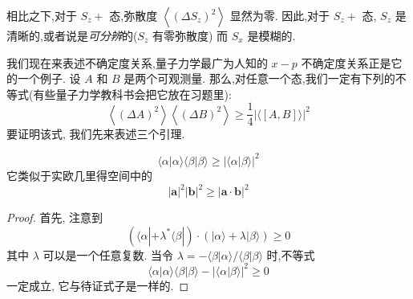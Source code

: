 \documentclass[lang=cn,newtx,10pt,scheme=chinese,thmcnt=section]{elegantbook}
\begin{document}
相比之下,对于 ${S}_{z} +$ 态,弥散度 $\left\langle {\left( \Delta {S}_{z}\right) }^{2}\right\rangle$ 显然为零. 因此,对于 ${S}_{z} +$ 态, ${S}_{z}$ 是清晰的,或者说是\textit{可分辨}的(${S}_{z}$ 有零弥散度) 而 ${S}_{x}$ 是模糊的.

我们现在来表述不确定度关系,量子力学最广为人知的 $x - p$ 不确定度关系正是它的一个例子. 设 $A$ 和 $B$ 是两个可观测量. 那么,对任意一个态,我们一定有下列的不等式(有些量子力学教科书会把它放在习题里):
\begin{equation}
	\left\langle {\left( \Delta A\right) }^{2}\right\rangle \left\langle {\left( \Delta B\right) }^{2}\right\rangle \geq \frac{1}{4}{\left| \langle \left\lbrack A, B\right\rbrack \rangle \right| }^{2}
\end{equation}
要证明该式, 我们先来表述三个引理.

\begin{lemma}\label{lem:1.1}
	\begin{equation}
		\langle \alpha \left| {\alpha \rangle \langle \beta }\right| \beta \rangle \geq {\left| \langle \alpha | \beta \rangle \right| }^{2}
	\end{equation}
	它类似于实欧几里得空间中的
	\begin{equation}
		{\left| \mathbf{a}\right| }^{2}{\left| \mathbf{b}\right| }^{2} \geq {\left| \mathbf{a} \cdot \mathbf{b}\right| }^{2}
	\end{equation}
\end{lemma}
\begin{proof}
	首先, 注意到
	\begin{equation}
		(\langle\alpha|+{\lambda }^{*}\langle \beta|)\cdot(|\alpha\rangle+\lambda|\beta\rangle) \geq 0
	\end{equation}
其中 $\lambda$ 可以是一个任意复数. 当令 $\lambda = - \langle \beta | \alpha \rangle /\langle \beta | \beta \rangle$ 时,不等式
	\begin{equation}
		\langle \alpha \left| {\alpha \rangle \langle \beta }\right| \beta \rangle - {\left| \langle \alpha | \beta \rangle \right| }^{2} \geq 0
	\end{equation}
	一定成立, 它与待证式子是一样的.
\end{proof}
\end{document}
